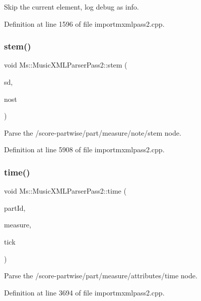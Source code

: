 Skip the current element, log debug as info. 

Definition at line 1596 of file importmxmlpass2.\+cpp.

\mbox{\label{class_ms_1_1_music_x_m_l_parser_pass2_ae0a8ca011a423a2b39dc803e6fb66361}} 
\subsubsection{\texorpdfstring{stem()}{stem()}}
{\footnotesize\ttfamily void Ms\+::\+Music\+X\+M\+L\+Parser\+Pass2\+::stem (\begin{DoxyParamCaption}\item[{\hyperlink{class_ms_1_1_direction}{Direction} \&}]{sd,  }\item[{bool \&}]{nost }\end{DoxyParamCaption})}

Parse the /score-\/partwise/part/measure/note/stem node. 

Definition at line 5908 of file importmxmlpass2.\+cpp.

\mbox{\label{class_ms_1_1_music_x_m_l_parser_pass2_aa5c606224d78e25bbc87cf9683f6705f}} 
\subsubsection{\texorpdfstring{time()}{time()}}
{\footnotesize\ttfamily void Ms\+::\+Music\+X\+M\+L\+Parser\+Pass2\+::time (\begin{DoxyParamCaption}\item[{const Q\+String \&}]{part\+Id,  }\item[{\hyperlink{class_ms_1_1_measure}{Measure} $\ast$}]{measure,  }\item[{const int}]{tick }\end{DoxyParamCaption})}

Parse the /score-\/partwise/part/measure/attributes/time node. 

Definition at line 3694 of file importmxmlpass2.\+cpp.

